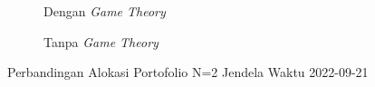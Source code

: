 % 
% 
% 
% 

% 
% 
% 
% 

\begin{figure}[!htbp]\centering\begin{subfigure}[b]{0.48\textwidth}\centering


\caption{Dengan \textit{Game Theory}}\end{subfigure}\hfill\begin{subfigure}[b]{0.48\textwidth}\centering


\caption{Tanpa \textit{Game Theory}}\end{subfigure}\caption{Perbandingan Alokasi Portofolio N=2 Jendela Waktu 2022-09-21}\label{fig:window_2022_09_21}\end{figure}

